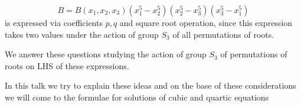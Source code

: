               $$
    B=B(x_1,x_2,x_3)(x_1^5-x_2^5)(x_2^5-x_3^5)(x_3^5-x_1^5)
              $$
is expressed via coefficients $p,q$ and square root operation,
since this expression takes two values
under the action of group $S_3$ of all permutations of roots.

  We answer these questions studying  the action of group $S_3$
of permutations of roots on LHS of these expressions.

  In this talk we try to explain these ideas and on the base
of these considerations we will come to the formulae
for solutions of cubic and quartic equations

\bye
